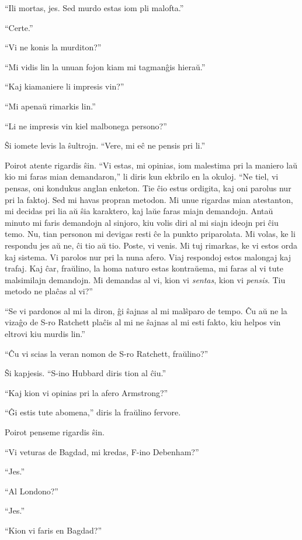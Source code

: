 ``Ili mortas, jes. Sed murdo estas iom pli malofta.''

``Certe.''

``Vi ne konis la murditon?''

``Mi vidis lin la unuan fojon kiam mi tagmanĝis hieraŭ.''

``Kaj kiamaniere li impresis vin?''

``Mi apenaŭ rimarkis lin.''

``Li ne impresis vin kiel malbonega persono?''

Ŝi iomete levis la ŝultrojn. ``Vere, mi eĉ ne pensis pri li.''

Poirot atente rigardis ŝin. ``Vi estas, mi opinias, iom malestima pri la maniero laŭ kio mi faras mian demandaron,'' li diris kun ekbrilo en la okuloj. ``Ne tiel, vi pensas, oni kondukus anglan enketon. Tie ĉio estus ordigita, kaj oni parolus nur pri la faktoj. Sed mi havas propran metodon. Mi unue rigardas mian atestanton, mi decidas pri lia aŭ ŝia karaktero, kaj laŭe faras miajn demandojn. Antaŭ minuto mi faris demandojn al sinjoro, kiu volis diri al mi siajn ideojn pri ĉiu temo. Nu, tian personon mi devigas resti ĉe la punkto priparolata. Mi volas, ke li respondu jes aŭ ne, ĉi tio aŭ tio. Poste, vi venis. Mi tuj rimarkas, ke vi estos orda kaj sistema. Vi parolos nur pri la nuna afero. Viaj respondoj estos malongaj kaj trafaj. Kaj ĉar, fraŭlino, la homa naturo estas kontraŭema, mi faras al vi tute malsimilajn demandojn. Mi demandas al vi, kion vi \emph{sentas}, kion vi \emph{pensis}. Tiu metodo ne plaĉas al vi?''

``Se vi pardonos al mi la diron, ĝi ŝajnas al mi malŝparo de tempo. Ĉu aŭ ne la vizaĝo de S-ro Ratchett plaĉis al mi ne ŝajnas al mi esti fakto, kiu helpos vin eltrovi kiu murdis lin.''

``Ĉu vi scias la veran nomon de S-ro Ratchett, fraŭlino?''

Ŝi kapjesis. ``S-ino Hubbard diris tion al ĉiu.''

``Kaj kion vi opinias pri la afero Armstrong?''

``Ĝi estis tute abomena,'' diris la fraŭlino fervore.

Poirot penseme rigardis ŝin.

``Vi veturas de Bagdad, mi kredas, F-ino Debenham?''

``Jes.''

``Al Londono?''

``Jes.''

``Kion vi faris en Bagdad?''

